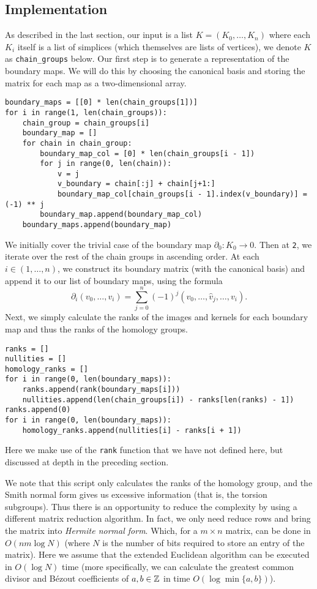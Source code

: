 \subsection*{Implementation}

As described in the last section, our input is a list $K = (K_0, \ldots, K_n)$ where each $K_i$ itself is a list of simplices (which themselves are lists of vertices), we denote $K$ as \texttt{chain\_groups} below. Our first step is to generate a representation of the boundary maps. We will do this by choosing the canonical basis and storing the matrix for each map as a two-dimensional array.

\begin{verbatim}
boundary_maps = [[0] * len(chain_groups[1])]
for i in range(1, len(chain_groups)):
    chain_group = chain_groups[i]
    boundary_map = []
    for chain in chain_group:
        boundary_map_col = [0] * len(chain_groups[i - 1])
        for j in range(0, len(chain)):
            v = j
            v_boundary = chain[:j] + chain[j+1:]
            boundary_map_col[chain_groups[i - 1].index(v_boundary)] = (-1) ** j
        boundary_map.append(boundary_map_col)
    boundary_maps.append(boundary_map)
\end{verbatim}

We initially cover the trivial case of the boundary map $\partial_0: K_0 \to 0$. Then at \texttt{2}, we iterate over the rest of the chain groups in ascending order. At each $i \in (1, \ldots, n)$, we construct its boundary matrix (with the canonical basis) and append it to our list of boundary maps, using the formula
\[
	\partial_i(v_0, \ldots, v_i) = \sum_{j=0}^n (-1)^j (v_0, \ldots, \hat v_j, \ldots, v_i).
\]
Next, we simply calculate the ranks of the images and kernels for each boundary map and thus the ranks of the homology groups. 

\begin{verbatim}
ranks = []
nullities = []
homology_ranks = []
for i in range(0, len(boundary_maps)):
    ranks.append(rank(boundary_maps[i]))
    nullities.append(len(chain_groups[i]) - ranks[len(ranks) - 1])
ranks.append(0)
for i in range(0, len(boundary_maps)):
    homology_ranks.append(nullities[i] - ranks[i + 1])
\end{verbatim}

Here we make use of the \texttt{rank} function that we have not defined here, but discussed at depth in the preceding section.

We note that this script only calculates the ranks of the homology group, and the Smith normal form gives us excessive information (that is, the torsion subgroups). Thus there is an opportunity to reduce the complexity by using a different matrix reduction algorithm. In fact, we only need reduce rows and bring the matrix into \emph{Hermite normal form}. Which, for a $m \times n$ matrix, can be done in $O(nm\log{N})$ (where $N$ is the number of bits required to store an entry of the matrix). Here we assume that the extended Euclidean algorithm can be executed in $O(\log{N})$ time (more specifically, we can calculate the greatest common divisor and B\'ezout coefficients of $a, b \in \mathbb{Z}$ in time $O(\log\min\{a,b\})$).